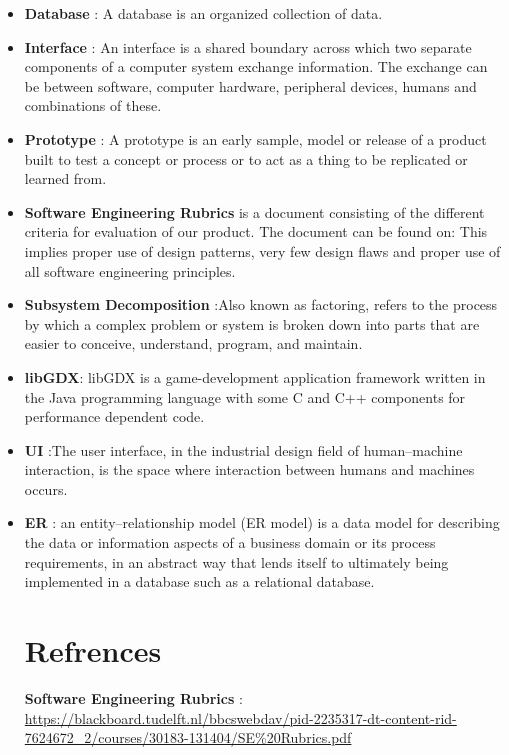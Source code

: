 \documentclass{article}
\begin{document}
	\begin{itemize}
		\item \textbf{Database} : A database is an organized collection of data.
		\item \textbf{Interface} : An interface is a shared boundary across which two separate components of a computer system exchange information. The exchange can be between software, computer hardware, peripheral devices, humans and combinations of these. 
		\item \textbf{Prototype} : A prototype is an early sample, model or release of a product built to test a concept or process or to act as a thing to be replicated or learned from.
		\item \textbf{Software Engineering Rubrics} is a document consisting of the different criteria for evaluation of our product. The document can be found on:  This implies proper use of design patterns, very few design flaws and proper use of all software engineering principles.
		\item \textbf{Subsystem Decomposition} :Also known as factoring, refers to the process by which a complex problem or system is broken down into parts that are easier to conceive, understand, program, and maintain.
		\item \textbf{libGDX}: libGDX is a game-development application framework written in the Java programming language with some C and C++ components for performance dependent code.
		\item \textbf{UI} :The user interface, in the industrial design field of human–machine interaction, is the space where interaction between humans and machines occurs.
		\item \textbf{ER} : an entity–relationship model (ER model) is a data model for describing the data or information aspects of a business domain or its process requirements, in an abstract way that lends itself to ultimately being implemented in a database such as a relational database.

		\section{Refrences}
		
			\textbf{Software Engineering Rubrics} : \url{https://blackboard.tudelft.nl/bbcswebdav/pid-2235317-dt-content-rid-7624672_2/courses/30183-131404/SE\%20Rubrics.pdf}
 
		
	\end{itemize}


	
\end{document}
